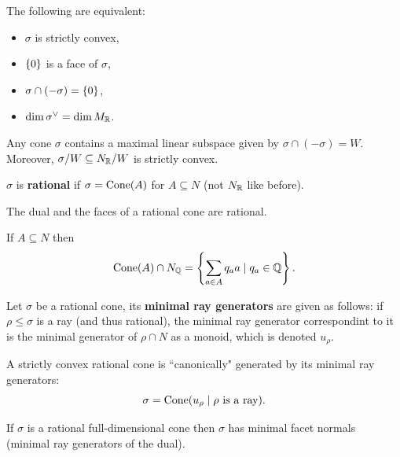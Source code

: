 \begin{fact}
The following are equivalent:
\begin{itemize}
\item $\sigma$ is strictly convex,
\item $\left\{{0}\right\}$ is a face of $\sigma$,
\item $\sigma\cap (-\sigma)=\left\{{0}\right\}$,
\item $\dim \sigma^\vee=\dim M_{\mathbb{R}}$.
\end{itemize}
\end{fact}

\begin{fact}
Any cone $\sigma$ contains a maximal linear subspace given by $\sigma\cap (-\sigma)=W$. Moreover, $\sigma/W\subseteq N_{\mathbb{R}}/W$ is strictly convex.
\end{fact}


\begin{definition}[]
$\sigma$ is \textbf{rational} if $\sigma=\operatorname{Cone}(A)$ for $A\subseteq N$ (not $N_{\mathbb{R}}$ like before).
\end{definition}



\begin{fact}
	The dual and the faces of a rational cone are rational.
\end{fact}

\begin{fact}
If $A\subseteq N$ then 
\[\operatorname{Cone}(A)\cap N_{\mathbb{Q}}=\left\{{\sum_{a\in A} q_a a\mid q_a\in \mathbb{Q}}\right\}.\]
\end{fact}

\begin{definition}[]
Let $\sigma$ be a rational cone, its \textbf{minimal ray generators} are given as follows: if $\rho\leq \sigma$ is a ray (and thus rational), the minimal ray generator correspondint to it is the minimal generator of $\rho\cap N$ as a monoid, which is denoted $u_\rho$.
\end{definition}

\begin{fact}
A strictly convex rational cone is ``canonically" generated by its minimal ray generators:
\[\sigma=\operatorname{Cone}(u_\rho\mid \rho\text{ is a ray}).\]
\end{fact}

\begin{corollary}
If $\sigma$ is a rational full-dimensional cone then $\sigma$ has minimal facet normals (minimal ray generators of the dual).
\end{corollary}




